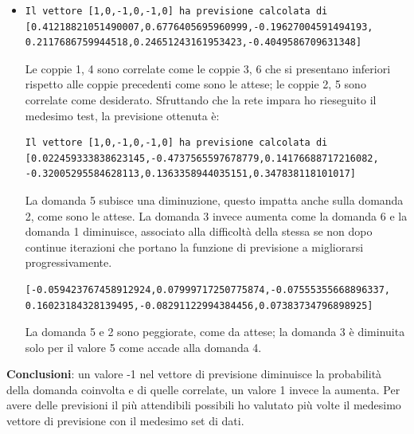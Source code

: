 \begin{itemize}
\item \begin{verbatim}
Il vettore [1,0,-1,0,-1,0] ha previsione calcolata di
[0.41218821051490007,0.6776405695960999,-0.19627004591494193,
0.2117686759944518,0.24651243161953423,-0.4049586709631348]
\end{verbatim}
Le coppie 1, 4 sono correlate come le coppie 3, 6 che si presentano inferiori rispetto alle coppie precedenti come sono le attese; le coppie 2, 5 sono correlate come desiderato.
Sfruttando che la rete impara ho rieseguito il medesimo test, la previsione ottenuta \`e:
\begin{verbatim}
Il vettore [1,0,-1,0,-1,0] ha previsione calcolata di
[0.022459333838623145,-0.4737565597678779,0.14176688717216082,
-0.32005295584628113,0.1363358944035151,0.347838118101017]
\end{verbatim}
La domanda 5 subisce una diminuzione, questo impatta anche sulla domanda 2, come sono le attese.
La domanda 3 invece aumenta come la domanda 6 e la domanda 1 diminuisce,  associato alla difficolt\`a della stessa se non dopo continue iterazioni che portano la funzione di previsione a migliorarsi progressivamente.
\begin{verbatim}
[-0.059423767458912924,0.07999717250775874,-0.07555355668896337,
0.16023184328139495,-0.08291122994384456,0.07383734796898925]
\end{verbatim}
La domanda 5 e 2 sono peggiorate, come da attese; la domanda 3 \`e diminuita solo per il valore 5 come accade alla domanda 4.
\end{itemize}
\noindent
\textbf{Conclusioni}: un valore -1 nel vettore di previsione diminuisce la probabilit\`a della domanda coinvolta e di quelle correlate, un valore 1 invece la aumenta. Per avere delle previsioni il pi\`u attendibili possibili ho valutato pi\`u volte il medesimo vettore di previsione con il medesimo set di dati.